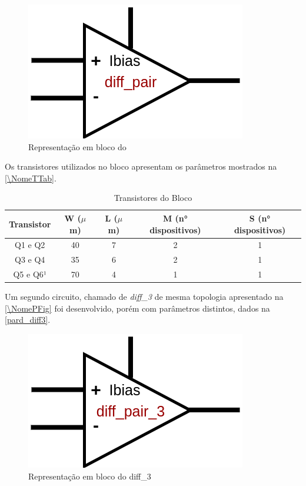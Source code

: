 \begin{figure}[htb]
 \centering
    \centering
    \caption{Representação em bloco do \NomeBloco} \label{\NomeSFig}
    \includegraphics[scale=0.3]{Circuitos/diff_pair_block.png}
\end{figure}

Os transistores utilizados no bloco \NomeBloco{} apresentam os par\^ametros mostrados na \autoref{\NomeTTab}.

\begin{table}[htbp]
\caption{Transistores do Bloco \NomeBloco}
\label{\NomeTTab}
\centering
\begin{tabular}{ccccc}
\toprule
Transistor & W ($\mu$m)  & L ($\mu$m)           & M (n° dispositivos) & S (n° dispositivos)\\
\midrule \midrule
Q1 e Q2 & 40 & 7 & 2 & 1\\
\midrule
Q3 e Q4 & 35 & 6 & 2 & 1\\
\midrule
Q5 e Q6¹ & 70 & 4 & 1 & 1\\

\bottomrule
\end{tabular}
\end{table}

Um segundo circuito, chamado de \emph{diff\_3} de mesma topologia apresentado na \autoref{\NomePFig} foi desenvolvido, por\'em com par\^ametros distintos, dados na \autoref{pard_diff3}.

\begin{figure}[htb]
 \centering
    \centering
    \caption{Representação em bloco do diff\_3} 
    \includegraphics[scale=0.3]{Circuitos/diff_pair_3_block.png}
\end{figure}


